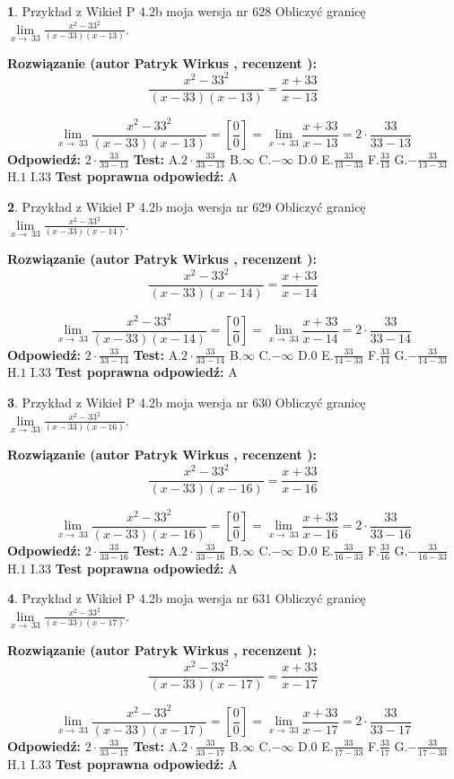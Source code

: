 \documentclass[12pt, a4paper]{article}
\theoremstyle{definition} %
\newtheorem{zad}{}
\newcommand{\zadStart}[1]{\begin{zad}#1\newline}
\newcommand{\zadStop}{\end{zad}}
\newcommand{\rozwStart}[2]{\noindent \textbf{Rozwiązanie (autor #1 , recenzent #2): }\newline}
\newcommand{\rozwStop}{\newline}
\newcommand{\odpStart}{\noindent \textbf{Odpowiedź:}\newline}
\newcommand{\odpStop}{\newline}
\newcommand{\testStart}{\noindent \textbf{Test:}\newline}
\newcommand{\testStop}{\newline}
\newcommand{\kluczStart}{\noindent \textbf{Test poprawna odpowiedź:}\newline}
\newcommand{\kluczStop}{\newline}
\begin{document}
\zadStart{Przykład z Wikieł P 4.2b moja wersja nr 628}
Obliczyć granicę $\lim\limits_{x\to\ 33}\frac{x^{2}-33^{2}}{(x-33)(x-13)}$.
\zadStop
\rozwStart{Patryk Wirkus}{}
$$\frac{x^{2}-33^{2}}{(x-33)(x-13)}=\frac{x+33}{x-13}$$

$$\lim\limits_{x\to\ 33}\frac{x^{2}-33^{2}}{(x-33)(x-13)}=[\frac{0}{0}]=\lim\limits_{x\to\ 33}\frac{x+33}{x-13}=2 \cdot \frac{33}{33-13}$$
\rozwStop
\odpStart
$2 \cdot \frac{33}{33-13}$
\odpStop
\testStart
A.$2 \cdot \frac{33}{33-13}$
B.$\infty$
C.$-\infty$
D.$0$
E.$\frac{33}{13-33}$
F.$\frac{33}{13}$
G.$-\frac{33}{13-33}$
H.$1$
I.$33$
\testStop
\kluczStart
A
\kluczStop



\zadStart{Przykład z Wikieł P 4.2b moja wersja nr 629}
Obliczyć granicę $\lim\limits_{x\to\ 33}\frac{x^{2}-33^{2}}{(x-33)(x-14)}$.
\zadStop
\rozwStart{Patryk Wirkus}{}
$$\frac{x^{2}-33^{2}}{(x-33)(x-14)}=\frac{x+33}{x-14}$$

$$\lim\limits_{x\to\ 33}\frac{x^{2}-33^{2}}{(x-33)(x-14)}=[\frac{0}{0}]=\lim\limits_{x\to\ 33}\frac{x+33}{x-14}=2 \cdot \frac{33}{33-14}$$
\rozwStop
\odpStart
$2 \cdot \frac{33}{33-14}$
\odpStop
\testStart
A.$2 \cdot \frac{33}{33-14}$
B.$\infty$
C.$-\infty$
D.$0$
E.$\frac{33}{14-33}$
F.$\frac{33}{14}$
G.$-\frac{33}{14-33}$
H.$1$
I.$33$
\testStop
\kluczStart
A
\kluczStop



\zadStart{Przykład z Wikieł P 4.2b moja wersja nr 630}
Obliczyć granicę $\lim\limits_{x\to\ 33}\frac{x^{2}-33^{2}}{(x-33)(x-16)}$.
\zadStop
\rozwStart{Patryk Wirkus}{}
$$\frac{x^{2}-33^{2}}{(x-33)(x-16)}=\frac{x+33}{x-16}$$

$$\lim\limits_{x\to\ 33}\frac{x^{2}-33^{2}}{(x-33)(x-16)}=[\frac{0}{0}]=\lim\limits_{x\to\ 33}\frac{x+33}{x-16}=2 \cdot \frac{33}{33-16}$$
\rozwStop
\odpStart
$2 \cdot \frac{33}{33-16}$
\odpStop
\testStart
A.$2 \cdot \frac{33}{33-16}$
B.$\infty$
C.$-\infty$
D.$0$
E.$\frac{33}{16-33}$
F.$\frac{33}{16}$
G.$-\frac{33}{16-33}$
H.$1$
I.$33$
\testStop
\kluczStart
A
\kluczStop



\zadStart{Przykład z Wikieł P 4.2b moja wersja nr 631}
Obliczyć granicę $\lim\limits_{x\to\ 33}\frac{x^{2}-33^{2}}{(x-33)(x-17)}$.
\zadStop
\rozwStart{Patryk Wirkus}{}
$$\frac{x^{2}-33^{2}}{(x-33)(x-17)}=\frac{x+33}{x-17}$$

$$\lim\limits_{x\to\ 33}\frac{x^{2}-33^{2}}{(x-33)(x-17)}=[\frac{0}{0}]=\lim\limits_{x\to\ 33}\frac{x+33}{x-17}=2 \cdot \frac{33}{33-17}$$
\rozwStop
\odpStart
$2 \cdot \frac{33}{33-17}$
\odpStop
\testStart
A.$2 \cdot \frac{33}{33-17}$
B.$\infty$
C.$-\infty$
D.$0$
E.$\frac{33}{17-33}$
F.$\frac{33}{17}$
G.$-\frac{33}{17-33}$
H.$1$
I.$33$
\testStop
\kluczStart
A
\kluczStop
\end{document}
